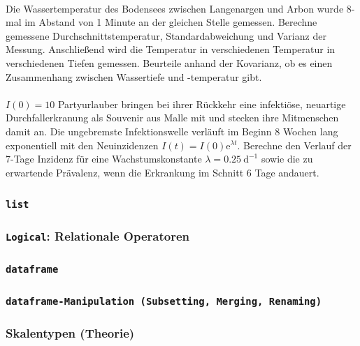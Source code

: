 \documentclass[paper=A4, pagesize, DIV=calc, smallheadings,
fontsize=12pt, expansion=false]{scrreprt}
\begin{document}
\paragraph{}
Die Wassertemperatur des Bodensees zwischen Langenargen und Arbon wurde 8-mal im Abstand von 1 Minute an der gleichen 
Stelle gemessen. Berechne 
gemessene Durchschnittstemperatur, Standardabweichung und Varianz der Messung. Anschließend wird die Temperatur in 
verschiedenen Temperatur in verschiedenen Tiefen gemessen. Beurteile anhand der Kovarianz, ob es 
einen Zusammenhang zwischen Wassertiefe und -temperatur gibt.

\paragraph{}
$I(0) = 10$ Partyurlauber bringen bei ihrer Rückkehr eine infektiöse, neuartige Durchfallerkranung als Souvenir aus 
Malle mit 
und stecken ihre Mitmenschen damit an.
Die ungebremste Infektionswelle verläuft im Beginn 8 Wochen lang exponentiell mit den Neuinzidenzen $I(t) = I(0) 
\text{e}^{\lambda t}$.
Berechne den Verlauf der 7-Tage Inzidenz für eine Wachstumskonstante $\lambda = \SI{0.25}{\text{d}^{-1}}$ sowie die zu 
erwartende Prävalenz, wenn die Erkrankung im Schnitt 6 Tage andauert.

\subsubsection*{\texttt{\textbf{list}}}

\subsubsection*{\texttt{\textbf{Logical}}: Relationale Operatoren}


\subsubsection*{\texttt{\textbf{dataframe}}}



\subsubsection*{\texttt{\textbf{dataframe}-Manipulation (Subsetting, Merging, Renaming)}}

\subsubsection*{Skalentypen (Theorie)}
\end{document}
